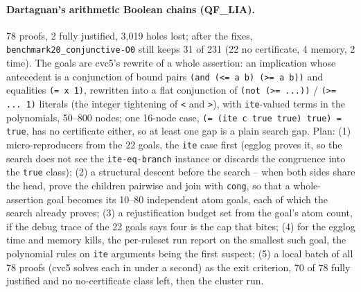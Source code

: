 \documentclass[11pt,a4paper]{article}
\newcommand{\LIA}{QF\_LIA}
\newcommand{\code}[1]{\texttt{#1}}
\begin{document}
\paragraph{Dartagnan's arithmetic Boolean chains (\LIA{}).} 78 proofs, 2
fully justified, 3,019 holes lost; after the fixes,
\code{benchmark20\_conjunctive-O0} still keeps 31 of 231 (22 no certificate, 4
memory, 2 time). The goals are cvc5's rewrite of a whole assertion: an
implication whose antecedent is a conjunction of bound pairs
\code{(and (<= a b) (>= a b))} and equalities \code{(= x 1)}, rewritten into
a flat conjunction of \code{(not (>= ...))} / \code{(>= ... 1)} literals (the
integer tightening of \code{<} and \code{>}), with \code{ite}-valued terms
in the polynomials, 50--800 nodes; one 16-node case,
\code{(= (ite c true true) true) = true}, has no certificate either, so at
least one gap is a plain search gap. Plan: (1) micro-reproducers from the
22 goals, the \code{ite} case first (egglog proves it, so the search does
not see the \code{ite-eq-branch} instance or discards the congruence into
the \code{true} class); (2) a structural descent before the search -- when
both sides share the head, prove the children pairwise and join with
\code{cong}, so that a whole-assertion goal becomes its 10--80 independent
atom goals, each of which the search already proves; (3) a rejustification
budget set from the goal's atom count, if the debug trace of the 22 goals
says four is the cap that bites; (4) for the egglog time and memory kills,
the per-ruleset run report on the smallest such goal, the polynomial rules
on \code{ite} arguments being the first suspect; (5) a local batch of all
78 proofs (cvc5 solves each in under a second) as the exit criterion,
70 of 78 fully justified and no no-certificate class left, then the
cluster run.
\end{document}
